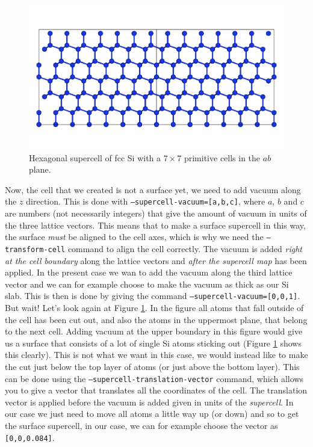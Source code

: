 \documentclass[11pt]{article}
\begin{document}
\begin{figure}[htbp] %
   \centering
   \includegraphics[width=\textwidth]{Si_large.pdf} 
   \caption{Hexagonal supercell of fcc Si with a $7\times7$ primitive cells in the $ab$ plane.}
   \label{largeSi}
\end{figure}

Now, the cell that we created is not a surface yet, we need to add vacuum along the $z$ direction. This is done with \texttt{--supercell-vacuum=[a,b,c]}, where $a$, $b$ and $c$ are numbers (not necessarily integers) that give the amount of vacuum in units of the three lattice vectors. This means that to make a surface supercell in this way, the surface \emph{must} be aligned to the cell axes, which is why we need the \texttt{--transform-cell} command to align the cell correctly. The vacuum is added \emph{right at the cell boundary} along the lattice vectors and \emph{after the supercell map} has been applied. In the present case we wan to add the vacuum along the third lattice vector and we can for example choose to make the vacuum as thick as our Si slab. This is then is done by giving the command \texttt{--supercell-vacuum=[0,0,1]}. But wait! Let's look again at Figure \ref{largeSi}. In the figure all atoms that fall outside of the cell has been cut out, and also the atoms in the uppermost plane, that belong to the next cell. Adding vacuum at the upper boundary in this figure would give us a surface that consists of a lot of single Si atoms sticking out (Figure \ref{largeSi} shows this clearly). This is not what we want in this case, we would instead like to make the cut just below the top layer of atoms (or just above the bottom layer). This can be done using the \texttt{--supercell-translation-vector} command, which allows you to give a vector that translates all the coordinates of the cell. The translation vector is applied before the vacuum is added given in units of the \emph{supercell}. In our case we just need to move all atoms a little way up (or down) and so to get the surface supercell, in our case, we can for example choose the vector as \texttt{[0,0,0.084]}. 
\end{document}
